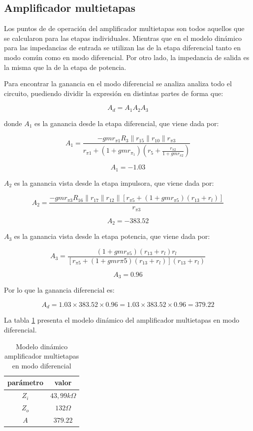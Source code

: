 \subsection{Amplificador multietapas}

Los puntos de de operación del amplificador multietapas son todos aquellos que se calcularon para las etapas individuales. Mientras que en el modelo dinámico para las impedancias de entrada se utilizan las de la etapa diferencial tanto en modo común como en modo diferencial. Por otro lado, la impedancia de salida es la misma que la de la etapa de potencia.


Para encontrar la ganancia en el modo diferencial se analiza analiza todo el circuito, puediendo dividir la expresión en distintas partes de forma que:

$$ A_d = A_1 A_2 A_3 $$

donde $A_1$ es la ganancia desde la etapa diferencial, que viene dada por:

$$ A_1 = \frac{-gmr_{\pi1} R_3 \parallel r_{15} \parallel r_{10} \parallel r_{\pi3}}{r_{\pi1} + (1+ gmr_{\pi_1})(r_5 + \frac{r_{\pi2}}{1 + gmr_{\pi2}})}$$

 $$A_1 = - 1.03 $$

 $A_2$ es la ganancia vista desde la etapa impulsora, que viene dada por:

 $$ A_2 = \frac{-gmr_{\pi3} R_{16} \parallel r_{17} \parallel r_{12} \parallel [r_{\pi5} + (1 + gmr_{\pi 5})(r_{13} + r_l)]}{r_{\pi 3}}$$

 $$A_2 =- 383.52 $$

 $A_3$ es la ganancia vista desde la etapa potencia, que viene dada por:

 $$ A_3 = \frac{(1 + gmr_{\pi5})(r_{13} + r_l)r_l}{[r_{\pi 5} + (1 + gmr\pi5)(r_{13} + r_l)](r_{13} + r_l)}$$

 $$A_3 = 0.96 $$

Por lo que la ganancia diferencial es: 

$$ A_d = 1.03 \times 383.52 \times 0.96 = 1.03 \times 383.52 \times 0.96 = 379.22 $$

La tabla \ref{tab:met-amp-multietapas-mod-diferencial} presenta el modelo dinámico del amplificador multietapas en modo diferencial.

\begin{table}[ht]
    \centering
    \begin{tabular}{|c|c|}
        \hline
        parámetro & valor  \\
        \hline
        $Z_i$ & $43,99k\Omega$ \\
        \hline
        $Z_o$ & $132\Omega$ \\
        \hline
        $A$ & $379.22$ \\
        \hline
    \end{tabular}
    \caption{Modelo dinámico amplificador multietapas en modo diferencial}
    \label{tab:met-amp-multietapas-mod-diferencial}
\end{table}

